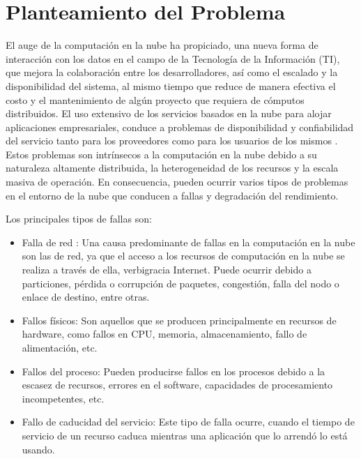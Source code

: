 \chapter{Planteamiento del Problema}
\par El auge de la computación en la nube ha propiciado, una nueva forma de interacción con los datos en el campo de la Tecnología de la Información (TI), que mejora la colaboración entre los desarrolladores, así como el escalado y la disponibilidad del sistema, al mismo tiempo que reduce de manera efectiva el costo y el mantenimiento de algún  proyecto que requiera de cómputos distribuidos. El uso extensivo de los servicios basados en la nube para alojar aplicaciones empresariales, conduce a problemas de disponibilidad y confiabilidad del servicio tanto para los proveedores  como para los usuarios de los mismos \cite{PLAN01,PLAN03}. Estos problemas son intrínsecos a la computación en la nube debido a su naturaleza altamente distribuida, la heterogeneidad de los recursos y la escala masiva de operación. En consecuencia, pueden ocurrir varios tipos de problemas en el entorno de la nube que conducen a fallas y degradación del rendimiento.\\

\par Los principales tipos de fallas \cite{PLAN04,PLAN05} son:
\begin{itemize}
    \item Falla de red : Una causa predominante de fallas en la computación en la nube son las de red, ya que el acceso a los recursos de computación en la nube se realiza a través de ella, verbigracia  Internet.  Puede ocurrir debido a particiones, pérdida o corrupción de paquetes, congestión, falla del nodo o enlace de destino, entre otras.
    \item Fallos físicos: Son aquellos que se producen principalmente en recursos de hardware, como fallos en CPU, memoria, almacenamiento, fallo de alimentación, etc.
    \item Fallos del proceso: Pueden producirse fallos en los procesos debido a la escasez de recursos, errores en el software, capacidades de procesamiento incompetentes, etc.
    \item Fallo de caducidad del servicio: Este tipo de falla ocurre, cuando el tiempo de servicio de un recurso caduca mientras una aplicación que lo arrendó lo está usando.
\end{itemize}

